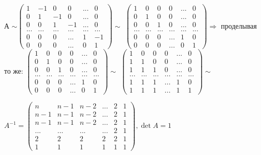\documentclass[12pt]{article}
\newenvironment{solutions}[2][Solutions]
{\begin{trivlist}\item[{\bfseries #1} {\bfseries #2.}]}{\end{trivlist}}
\begin{document}
\begin{solutions}{5} 
А $\sim \begin{pmatrix}
1 & -1 & 0 & 0 & ... & 0\\
0 & 1 & -1 & 0 & ... & 0\\
0 & 0 & 1 & -1 & ... & 0\\
... & ... & ... & ... & ... & ...\\
0 & 0 & 0 & ... & 1 & -1\\
0 & 0 & 0 & ... & 0 & 1
\end{pmatrix} \sim$
$\begin{pmatrix}
1 & 0 & 0 & 0 & ... & 0\\
0 & 1 & 0 & 0 & ... & 0\\
0 & 0 & 1 & 0 & ... & 0\\
... & ... & ... & ... & ... & ...\\
0 & 0 & 0 & ... & 1 & 0\\
0 & 0 & 0 & ... & 0 & 1
\end{pmatrix} \Rightarrow$ 
проделывая то же:
$\begin{pmatrix}
1 & 0 & 0 & 0 & ... & 0\\
0 & 1 & 0 & 0 & ... & 0\\
0 & 0 & 1 & 0 & ... & 0\\
... & ... & ... & ... & ... & ...\\
0 & 0 & 0 & ... & 1 & 0\\
0 & 0 & 0 & ... & 0 & 1
\end{pmatrix} \sim$
$\begin{pmatrix}
1 & 0 & 0 & 0 & ... & 0\\
1 & 1 & 0 & 0 & ... & 0\\
1 & 1 & 1 & 0 & ... & 0\\
... & ... & ... & ... & ... & ...\\
1 & 1 & 1 & ... & 1 & 0\\
1 & 1 & 1 & ... & 1 & 1
\end{pmatrix} \sim$ 

$A^{-1}=
\begin{pmatrix}
n & n-1 & n-2 & ... & 2 & 1\\
n-1 & n-1 & n-2 & ... & 2 & 1\\
n-1 & n-1 & n-2 & ... & 2 & 1\\
... & ... & ... & ... & 2 & 1\\
2 & 2 & 2 & 2 & 2 & 1\\
1 & 1 & 1 & 1 & 1 & 1
\end{pmatrix}, 
\det A = 1$
\end{solutions}
\end{document}
